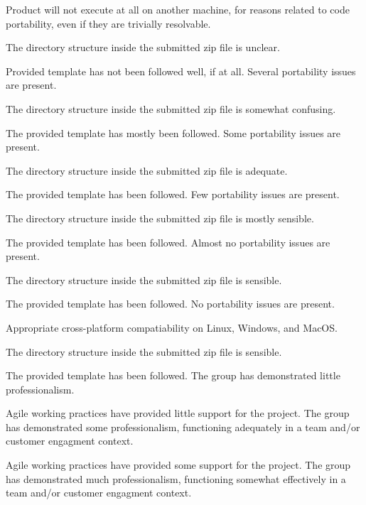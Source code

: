 \documentclass{../fal_assignment}
\begin{document}
\begin{markingrubric}
%
        \grade\fail Product will not execute at all on another machine, for reasons related to code portability, even if they are trivially resolvable.
            \par The directory structure inside the submitted zip file is unclear.
            \par Provided template has not been followed well, if at all.
        \grade Several portability issues are present.
            \par The directory structure inside the submitted zip file is somewhat confusing.
            \par The provided template has mostly been followed.
        \grade Some portability issues are present.
            \par The directory structure inside the submitted zip file is adequate.
            \par The provided template has been followed.
        \grade Few portability issues are present.
            \par The directory structure inside the submitted zip file is mostly sensible.
            \par The provided template has been followed.
        \grade Almost no portability issues are present.
            \par The directory structure inside the submitted zip file is sensible.
            \par The provided template has been followed.
        \grade No portability issues are present.
            \par Appropriate cross-platform compatiability on Linux, Windows, and MacOS.
            \par The directory structure inside the submitted zip file is sensible.
            \par The provided template has been followed.
%
        \grade \fail The group has demonstrated little professionalism.
            \par Agile working practices have provided little support for the project.
        \grade The group has demonstrated some professionalism,
            functioning adequately in a team and/or customer engagment context.
            \par Agile working practices have provided some support for the project.
        \grade The group has demonstrated much professionalism,
            functioning somewhat effectively in a team and/or customer engagment context.

\end{markingrubric}
\end{document}
